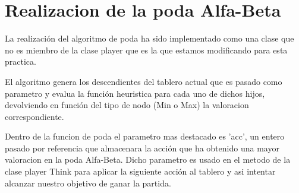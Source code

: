 \section{Realizacion de la poda Alfa-Beta}
\label{sec:poda}

	La realización del algoritmo de poda ha sido implementado como una clase que no es miembro de la clase player que es la que estamos modificando para esta practica.

	El algoritmo genera los descendientes del tablero actual que es pasado como parametro y evalua la función heuristica para cada uno de dichos hijos, devolviendo en función del tipo de nodo (Min o Max) la valoracion correspondiente.

	Dentro de la funcion de poda el parametro mas destacado es 'acc', un entero pasado por referencia que almacenara la acción que ha obtenido una mayor valoracion en la poda Alfa-Beta. Dicho parametro es usado en el metodo de la clase player Think para aplicar la siguiente acción al tablero y asi intentar alcanzar nuestro objetivo de ganar la partida.
